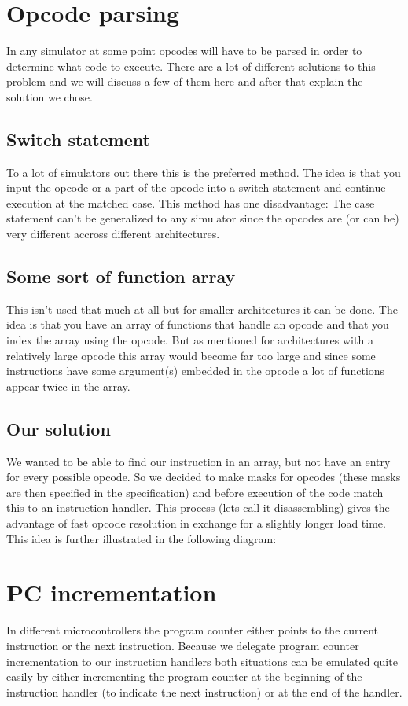 \section[Opcode parsing]{Opcode parsing}
In any simulator at some point opcodes will have to be parsed in order
to determine what code to execute. There are a lot of different
solutions to this problem and we will discuss a few of them here and
after that explain the solution we chose.

\subsection[Switch statement]{Switch statement}
To a lot of simulators out there this is the preferred method. The idea
is that you input the opcode or a part of the opcode into a switch
statement and continue execution at the matched case. This method has
one disadvantage: The case statement can't be generalized to any
simulator since the opcodes are (or can be) very different accross
different architectures.

\subsection{Some sort of function array}
This isn't used that much at all but for smaller architectures it can be
done. The idea is that you have an array of functions that handle an
opcode and that you index the array using the opcode. But as mentioned
for architectures with a relatively large opcode this array would
become far too large and since some instructions have some argument(s)
embedded in the opcode a lot of functions appear twice in the array.

\subsection{Our solution}
We wanted to be able to find our instruction in an array, but not have
an entry for every possible opcode. So we decided to make masks for
opcodes (these masks are then specified in the specification) and
before execution of the code match this to an instruction handler. This
process (lets call it disassembling) gives the advantage of fast opcode
resolution in exchange for a slightly longer load time. This idea is
further illustrated in the following diagram:

\section[PC incrementation]{PC incrementation}
In different microcontrollers the program counter either points to the
current instruction or the next instruction. Because we delegate
program counter incrementation to our instruction handlers both
situations can be emulated quite easily by either incrementing the
program counter at the beginning of the instruction handler (to
indicate the next instruction) or at the end of the handler.

